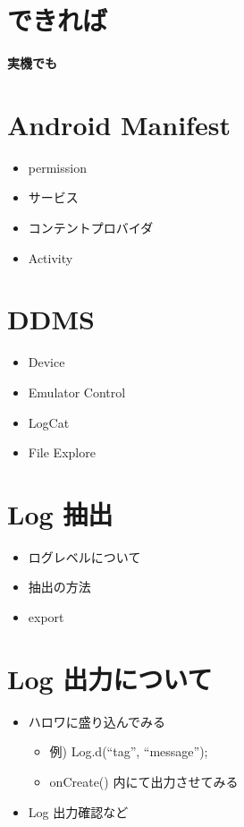 \documentclass[slide,papersize]{jsarticle}
\begin{document}
\section*{できれば}
\vspace*{17mm}
\begin{center}
{\Huge {\bf 実機でも}}
\end{center}

\section*{Android Manifest}
\bigskip
\begin{itemize}
\item permission
\bigskip
\item サービス
\bigskip
\item コンテントプロバイダ
\bigskip
\item Activity
\end{itemize}

\section*{DDMS}
\bigskip
\begin{itemize}
\item Device
\bigskip
\item Emulator Control
\bigskip
\item LogCat
\bigskip
\item File Explore
\end{itemize}

\section*{Log 抽出}
\bigskip
\begin{itemize}
\item ログレベルについて
\bigskip
\item 抽出の方法
\bigskip
\item export
\end{itemize}

\section*{Log 出力について}
\bigskip
\begin{itemize}
\item ハロワに盛り込んでみる
 \begin{itemize}
 \item 例) Log.d(``tag'', ``message'');
 \medskip
 \item onCreate() 内にて出力させてみる
 \end{itemize}
\bigskip
\item Log 出力確認など
\end{itemize}
\end{document}
